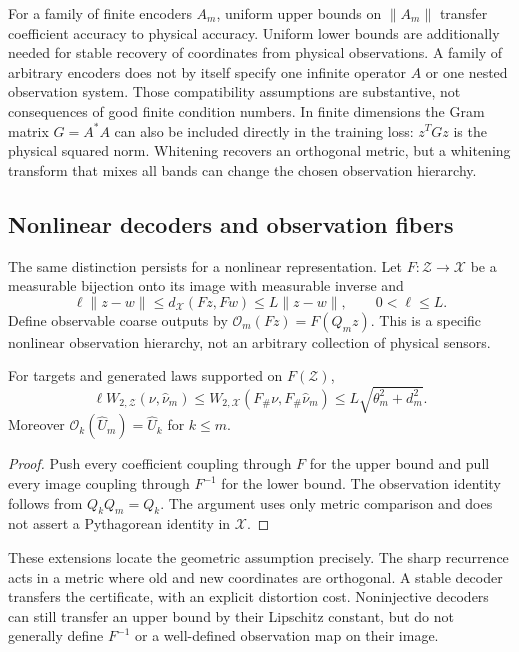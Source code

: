 For a family of finite encoders $A_m$, uniform upper bounds on $\|A_m\|$ transfer coefficient accuracy to physical accuracy. Uniform lower bounds are additionally needed for stable recovery of coordinates from physical observations. A family of arbitrary encoders does not by itself specify one infinite operator $A$ or one nested observation system. Those compatibility assumptions are substantive, not consequences of good finite condition numbers. In finite dimensions the Gram matrix $G=A^*A$ can also be included directly in the training loss: $z^TGz$ is the physical squared norm. Whitening recovers an orthogonal metric, but a whitening transform that mixes all bands can change the chosen observation hierarchy.

\subsection{Nonlinear decoders and observation fibers}
The same distinction persists for a nonlinear representation. Let $F:\mathcal Z\to\mathcal X$ be a measurable bijection onto its image with measurable inverse and
\[
 \ell\|z-w\|\le d_{\mathcal X}(Fz,Fw)\le L\|z-w\|,
 \qquad 0<\ell\le L.
\]
Define observable coarse outputs by $\mathcal O_m(Fz)=F(Q_mz)$. This is a specific nonlinear observation hierarchy, not an arbitrary collection of physical sensors.

\begin{corollary}\label{cor:nonlinear-decoder}
For targets and generated laws supported on $F(\mathcal Z)$,
\[
 \ell W_{2,\mathcal Z}(\nu,\widehat\nu_m)
 \le W_{2,\mathcal X}(F_\#\nu,F_\#\widehat\nu_m)
 \le L\sqrt{\theta_m^2+d_m^2}.
\]
Moreover $\mathcal O_k(\widehat U_m)=\widehat U_k$ for $k\le m$.
\end{corollary}
\begin{proof}
Push every coefficient coupling through $F$ for the upper bound and pull every image coupling through $F^{-1}$ for the lower bound. The observation identity follows from $Q_kQ_m=Q_k$. The argument uses only metric comparison and does not assert a Pythagorean identity in $\mathcal X$.
\end{proof}

These extensions locate the geometric assumption precisely. The sharp recurrence acts in a metric where old and new coordinates are orthogonal. A stable decoder transfers the certificate, with an explicit distortion cost. Noninjective decoders can still transfer an upper bound by their Lipschitz constant, but do not generally define $F^{-1}$ or a well-defined observation map on their image.
